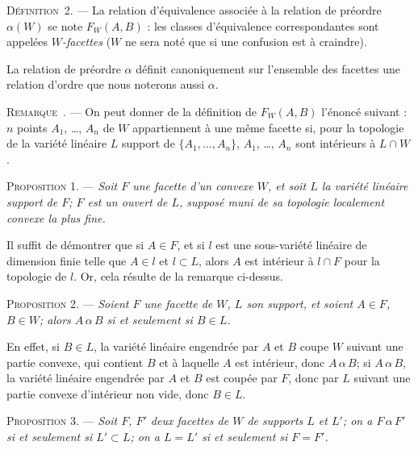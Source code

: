 \documentclass[11pt]{article}
\newcommand{\bzcf}[2]{#1}
\newcommand{\bznum}[1]{\if\relax\detokenize{#1}\relax\else\ #1\fi}
\newenvironment{defin}[1][]{\par\medskip\noindent\textsc{Définition\bznum{#1}.} --- }{\par\medskip}
\newenvironment{prop}[1][]{\par\medskip\noindent\textsc{Proposition #1.} --- \itshape}{\par\medskip}
\newenvironment{remarque}[1][]{\par\medskip\noindent\textsc{Remarque\bznum{#1}.} --- }{\par\medskip}
\newenvironment{proof}[1][]{\par}{\par}
\begin{document}
\begin{defin}[2]
La relation d'équivalence associée à la relation de préordre $\alpha(W)$ se note $F_W(A, B)$ :
les classes d'équivalence correspondantes sont appelées \textit{$W$-facettes} ($W$ ne sera noté
que si une confusion est à craindre).

La relation de préordre $\alpha$ définit canoniquement sur l'ensemble des facettes une relation
d'ordre que nous noterons aussi $\alpha$.
\end{defin}

\begin{remarque}
On peut donner de la définition de $F_W(A, B)$ l'énoncé suivant : $n$ points $A_1$, \ldots, $A_n$
de $W$ appartiennent à une même facette si, pour la topologie de la variété linéaire $L$ support
de $\{A_1, \ldots, A_n\}$, $A_1$, \ldots, $A_n$ sont intérieurs à $L\cap W$.
\end{remarque}

\begin{prop}[1]
Soit $F$ une facette d'un convexe $W$, et soit $L$ la variété linéaire support de $F$; $F$ est un
ouvert de $L$, supposé muni de sa topologie localement convexe la plus fine.
\end{prop}

\begin{proof}
Il suffit de démontrer que si $A\in F$, et si $l$ est une sous-variété linéaire de dimension finie
telle que $A\in l$ et $l\subset L$, alors $A$ est intérieur à $l\cap F$ pour la topologie de $l$.
Or, cela résulte de \bzcf{la remarque ci-dessus}{\ref{bzrem:c3s1r1_facette_points_interieurs}}.
\end{proof}

\begin{prop}[2]
Soient $F$ une facette de $W$, $L$ son support, et soient $A\in F$, $B\in W$; alors
$A\,\alpha\,B$ si et seulement si $B\in L$.
\end{prop}

\begin{proof}
En effet, si $B\in L$, la variété linéaire engendrée par $A$ et $B$ coupe $W$ suivant une partie
convexe, qui contient $B$ et à laquelle $A$ est intérieur, donc $A\,\alpha\,B$; si
$A\,\alpha\,B$, la variété linéaire engendrée par $A$ et $B$ est coupée par $F$, donc par $L$
suivant une partie convexe d'intérieur non vide, donc $B\in L$.
\end{proof}

\begin{prop}[3]
Soit $F$, $F'$ deux facettes de $W$ de supports $L$ et $L'$; on a $F\,\alpha\,F'$ si et seulement
si $L'\subset L$; on a $L=L'$ si et seulement si $F=F'$.
\end{prop}
\end{document}
